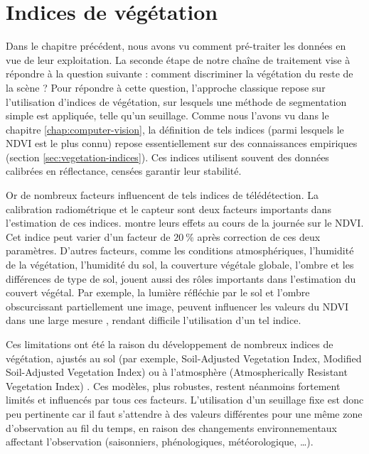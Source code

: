 \documentclass[../thesis.tex]{subfiles}
\begin{document}
	\chapter{Indices de végétation}
	\label{chap:vegetation-indices}
	
	Dans le chapitre précédent, nous avons vu comment pré-traiter les données en vue de leur exploitation. La seconde étape de notre chaîne de traitement vise à répondre à la question suivante : comment discriminer la végétation du reste de la scène ? Pour répondre à cette question, l'approche classique repose sur l'utilisation d'indices de végétation, sur lesquels une méthode de segmentation simple est appliquée, telle qu'un seuillage. Comme nous l'avons vu dans le chapitre \ref{chap:computer-vision}, la définition de tels indices (parmi lesquels le NDVI est le plus connu) repose essentiellement sur des connaissances empiriques \cite{bannari1995review} (section \ref{sec:vegetation-indices}). Ces indices utilisent souvent des données calibrées en réflectance, censées garantir leur stabilité.

    Or de nombreux facteurs influencent de tels indices de télédétection. La calibration radiométrique et le capteur sont deux facteurs importants dans l'estimation de ces indices. \cite{lee2021comparison} montre leurs effets au cours de la journée sur le NDVI. Cet indice peut varier d'un facteur de $\SI{20}{\percent}$ après correction de ces deux paramètres. D'autres facteurs, comme les conditions atmosphériques, l'humidité de la végétation, l'humidité du sol, la couverture végétale globale, l'ombre et les différences de type de sol, jouent aussi des rôles importants dans l'estimation du couvert végétal. Par exemple, la lumière réfléchie par le sol et l'ombre obscurcissant partiellement une image, peuvent influencer les valeurs du NDVI dans une large mesure \cite{Zhang2015}, rendant difficile l'utilisation d'un tel indice.
    
    Ces limitations ont été la raison du développement de nombreux indices de végétation, ajustés au sol (par exemple, Soil-Adjusted Vegetation Index, Modified Soil-Adjusted Vegetation Index) ou à l'atmosphère (Atmospherically Resistant Vegetation Index) \cite{bannari1995review}. Ces modèles, plus robustes, restent néanmoins fortement limités et influencés par tous ces facteurs. L'utilisation d'un seuillage fixe est donc peu pertinente car il faut s'attendre à des valeurs différentes pour une même zone d'observation au fil du temps, en raison des changements environnementaux affectant l'observation (saisonniers, phénologiques, météorologique, \dots).
    
\end{document}
